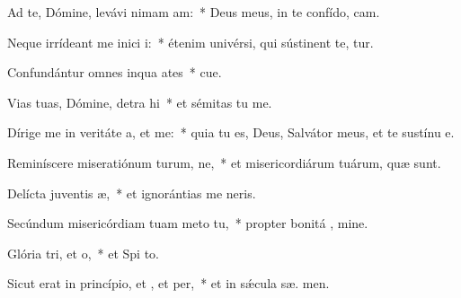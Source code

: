 \item Ad te, Dómine, levávi nimam am:~* Deus meus, in te confído,  cam.
\item Neque irrídeant me inici i:~* étenim univérsi, qui sústinent te,  tur.
\item Confundántur omnes inqua ates~* cue.
\item Vias tuas, Dómine, detra hi~* et sémitas tu  me.
\item Dírige me in veritáte a, et  me:~* quia tu es, Deus, Salvátor meus, et te sustínu  e.
\item Reminíscere miseratiónum turum, ne,~* et misericordiárum tuárum, quæ   sunt.
\item Delícta juventis æ,~* et ignorántias me  neris.
\item Secúndum misericórdiam tuam meto  tu,~* propter bonitá , mine.
\item Glória tri, et o,~* et Spi to.
\item Sicut erat in princípio, et , et per,~* et in sǽcula sæ. men.
